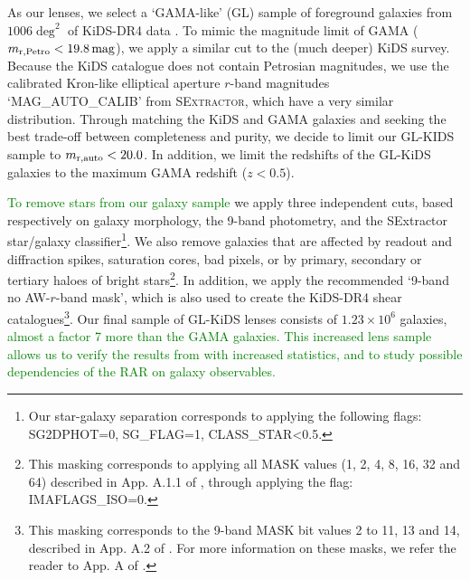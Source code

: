 \documentclass[usenatbib]{mnras}
\newcommand{\magn}{\, {\rm mag} }
\newcommand*{\E}[1]{\times 10^{#1}}
\newcommand{\un}[1]{_{\rm #1}}
\begin{document}
As our lenses, we select a `GAMA-like' (GL) sample of foreground galaxies from $1006 \deg^2$ of KiDS-DR4 data \cite[KiDS-1000,][]{kuijken2019}. To mimic the magnitude limit of GAMA ($m\un{r,Petro}<19.8 \magn$), we apply a similar cut to the (much deeper) KiDS survey. Because the KiDS catalogue does not contain Petrosian magnitudes, we use the calibrated Kron-like elliptical aperture $r$-band magnitudes `MAG\_AUTO\_CALIB' from \textsc{SExtractor}, which have a very similar distribution. Through matching the KiDS and GAMA galaxies and seeking the best trade-off between completeness and purity, we decide to limit our GL-KIDS sample to $m\un{r,auto}<20.0$. In addition, we limit the redshifts of the GL-KiDS galaxies to the maximum GAMA redshift ($z<0.5$).

\textcolor{Green}{To remove stars from our galaxy sample} we apply three independent cuts, based respectively on galaxy morphology, the 9-band photometry, and the SExtractor star/galaxy classifier\footnote{Our star-galaxy separation corresponds to applying the following flags: SG2DPHOT=0, SG\_FLAG=1, CLASS\_STAR<0.5.}. We also remove galaxies that are affected by readout and diffraction spikes, saturation cores, bad pixels, or by primary, secondary or tertiary haloes of bright stars\footnote{This masking corresponds to applying all MASK values (1, 2, 4, 8, 16, 32 and 64) described in App. A.1.1 of \cite{kuijken2019}, through applying the flag: IMAFLAGS\_ISO=0.}. In addition, we apply the recommended `9-band no AW-$r$-band mask', which is also used to create the KiDS-DR4 shear catalogues\footnote{This masking corresponds to the 9-band MASK bit values 2 to 11, 13 and 14, described in App. A.2 of \cite{kuijken2019}. For more information on these masks, we refer the reader to App. A of \cite{kuijken2019}.}. Our final sample of GL-KiDS lenses consists of $1.23\E{6}$ galaxies, \textcolor{Green}{almost a factor 7 more than the GAMA galaxies. This increased lens sample allows us to verify the results from \cite{brouwer2017} with increased statistics, and to study possible dependencies of the RAR on galaxy observables.}
\end{document}
